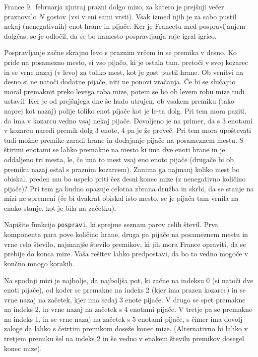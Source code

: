 \documentclass[arhiv]{../izpit}
\begin{document}


\naloga

France 9.~februarja zjutraj prazni dolgo mizo, za katero je prejšnji večer praznovalo $N$ gostov (vsi v eni sami vrsti). Vsak izmed njih je za sabo pustil nekaj (nenegativnih) enot hrane in pijače. Ker je Francetu med pospravljanjem dolgčas, se je odločil, da se bo namesto pospravljanja raje igral igrico.

Pospravljanje začne skrajno levo s praznim vrčem in se premika v desno. Ko pride na posamezno mesto, si vso pijačo, ki je ostala tam, pretoči v svoj kozarec in se vrne nazaj (v levo) za toliko mest, kot je gost pustil hrane. Ob vrnitvi na desno si ne natoči dodatne pijače, niti ne ponovi vračanja. Če bi se slučajno moral premaknit preko levega roba mize, potem se bo ob levem robu mize tudi ustavil. Ker je od prejšnjega dne še hudo utrujen, ob vsakem premiku (tako naprej kot nazaj) polije toliko enot pijače kot je le-ta dolg. Pri tem mora paziti, da ima v kozarcu vedno vsaj nekaj pijače. Dovoljeno je na primer, da s 3 enotami v kozarcu naredi premik dolg 3 enote, 4 pa je že preveč. Pri tem mora upoštevati tudi možne premike zaradi hrane in dodajanje pijače na posameznem mestu. S štirimi enotami se lahko premakne na mesto ki ima dve enoti hrane in je oddaljeno tri mesta, le, če ima to mest vsaj eno enoto pijače (drugače bi ob premiku nazaj ostal s praznim kozarcem). Zanima ga najmanj koliko mest bo obiskal, preden mu bo uspelo priti čez desni konec mize (z nenegativno količino pijače)? Pri tem ga budno opazuje celotna zbrana družba in skrbi, da se stanje na mizi ne spremeni (če bi dvakrat obiskal isto mesto, se je pijača tam vrnila na enako stanje, kot je bila na začetku).

Napišite funkcijo \verb|pospravi|, ki sprejme seznam parov celih števil. Prva komponenta para pove količino hrane, druga pa pijače na posameznem mestu in vrne celo število, najmanjše število premikov, ki jih mora France opraviti, da se prebije do konca mize. Vaša rešitev lahko predpostavi, da bo to vedno mogoče v končno mnogo korakih.

Na spodnji mizi je najbolje, da najboljša pot, ki začne na indeksu 0 (si natoči dve enoti pijače), od koder se premakne na indeks 2 (kjer ima prazen kozarec) in se vrne nazaj na začetek, kjer ima sedaj 3 enote pijače. V drugo se spet premakne na indeks 2, in vrne nazaj na začetek s 4 enotami pijače. V tretje pa se premakne na indeks 1, in se vrne nazaj na začetek s 5 enotami pijače, s čimer ima dovolj zaloge da lahko s četrtim premikom doseže konec mize. (Alternativno bi lahko v tretjem premiku šel na indeks 2 in še vedno v enakem številu premikov dosegel konec mize).
\end{document}
